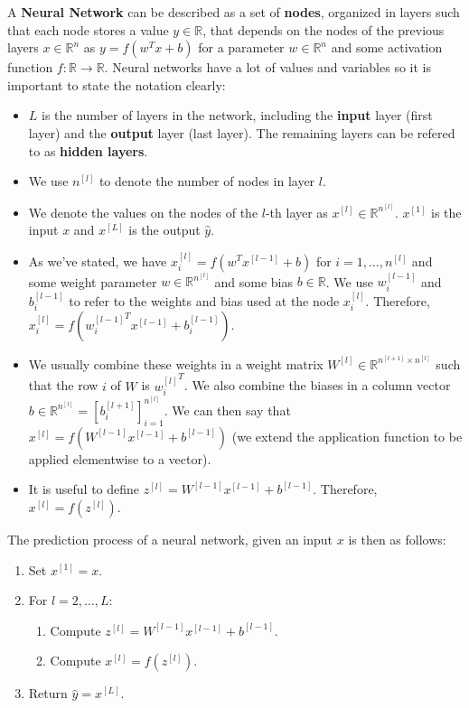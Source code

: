 \documentclass{article}
\newcommand{\R}{\mathbb{R}}
\begin{document}
A \textbf{Neural Network} can be described as a set of \textbf{nodes}, organized in layers such that each node stores a value $y \in \R$, that depends on the nodes of the previous layers $x \in \R^n$ as $y = f(w^T x + b)$ for a parameter $w \in \R^n$ and some activation function $f: \R \to \R$.
Neural networks have a lot of values and variables so it is important to state the notation clearly:
\begin{itemize}
\item $L$ is the number of layers in the network, including the \textbf{input} layer (first layer) and the \textbf{output} layer (last layer). The remaining layers can be refered to as \textbf{hidden layers}.
\item We use $n^{[l]}$ to denote the number of nodes in layer $l$.
\item We denote the values on the nodes of the $l$-th layer as $x^{[l]} \in \R^{n^{[l]}}$. $x^{[1]}$ is the input $x$ and $x^{[L]}$ is the output $\hat{y}$. 
\item As we've stated, we have $x^{[l]}_i = f(w^T x^{[l-1]} + b)$ for $i = 1, \dots, n^{[l]}$ and some weight parameter $w \in \R^{n^{[l]}}$ and some bias $b \in \R$. We use $w^{[l-1]}_i$ and $b^{[l-1]}_i$ to refer to the weights and bias used at the node $x^{[l]}_i$. Therefore, $x^{[l]}_i = f({w^{[l-1]}_i}^T x^{[l-1]} + b^{[l-1]}_i)$. 
\item We usually combine these weights in a weight matrix $W^{[l]} \in \R^{n^{[l+1]} \times n^{[l]}}$ such that the row $i$ of $W$ is ${w^{[l]}_i}^T$. We also combine the biases in a column vector $b \in \R^{n^{[l]}} = [b^{[l+1]}_i]_{i=1}^{n^{[l]}}$. We can then say that $x^{[l]} = f(W^{[l-1]}x^{[l-1]} + b^{[l-1]})$ (we extend the application function to be applied elementwise to a vector).
\item It is useful to define $z^{[l]} = W^{[l-1]}x^{[l-1]} + b^{[l-1]}$. Therefore, $x^{[l]} = f(z^{[l]})$.
\end{itemize}

The prediction process of a neural network, given an input $x$ is then as follows:
\begin{enumerate}
\item Set $x^{[1]} = x$.
\item For $l = 2, \dots, L$:
\begin{enumerate}
\item Compute $z^{[l]} = W^{[l-1]}x^{[l-1]} + b^{[l-1]}$.
\item Compute $x^{[l]} = f(z^{[l]})$.
\end{enumerate}
\item Return $\hat{y} = x^{[L]}$.
\end{enumerate}
\end{document}
